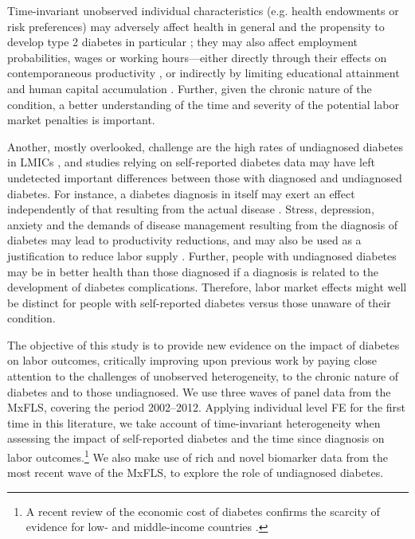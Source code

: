 \documentclass[12pt,english]{article}
\begin{document}
Time-invariant unobserved individual characteristics (e.g. health endowments or risk preferences) may adversely affect health in general and the propensity to develop type 2 diabetes in particular \parencite{VanEwijk2011,Sotomayor2013,Li2010b}; they may also affect employment probabilities, wages or working hours---either directly through their effects on contemporaneous productivity \parencite{Currie2013}, or indirectly by limiting educational attainment and human capital accumulation \parencite{Ayyagari2011a}. Further, given the chronic nature of the condition, a better understanding of the time and severity of the potential labor market penalties is important. 

Another, mostly overlooked, challenge are the high rates of undiagnosed diabetes in \acp{LMIC} \parencite{Beagley2014},  and studies relying on self-reported diabetes data may have left undetected important differences between those with diagnosed and undiagnosed diabetes. For instance, a diabetes diagnosis in itself may exert an effect independently of that resulting from the actual disease \parencite{Liu2014}. Stress, depression, anxiety and the demands of disease management resulting from the diagnosis of diabetes may lead to productivity reductions, and may also be used as a justification to reduce labor supply \parencite{Kapteyn2009}. Further, people with undiagnosed diabetes may be in better health than those diagnosed if a diagnosis is related to the development of diabetes complications. Therefore, labor market effects might well be distinct for people with self-reported diabetes versus those unaware of their condition.

The objective of this study is to provide new evidence on the impact of diabetes on labor outcomes, critically improving upon previous work by paying close attention to the challenges of unobserved heterogeneity, to the chronic nature of diabetes and to those undiagnosed. We use three waves of panel data from the \acf{MxFLS}, covering the period 2002--2012. Applying individual level \acf{FE} for the first time in this literature, we take account of time-invariant heterogeneity when assessing the impact of self-reported diabetes and the time since diagnosis on labor outcomes.\footnote{A recent review of the economic cost of diabetes confirms the scarcity of evidence for low- and middle-income countries \parencite{Seuring2015a}.} We also make use of rich and novel biomarker data from the most recent wave of the \ac{MxFLS}, to explore the role of undiagnosed diabetes.
\end{document}
